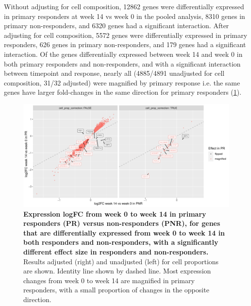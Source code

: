 Without adjusting for cell composition,
12862 genes were differentially expressed in primary responders at week 14 vs week 0 in the pooled analysis,
8310 genes in primary non-responders,
and 6320 genes had a significant interaction.
After adjusting for cell composition, 
5572 genes were differentially expressed in primary responders,
626 genes in primary non-responders,
and 179 genes had a significant interaction.
Of the genes differentially expressed between week 14 and week 0 in both primary responders and non-responders,
and with a significant interaction between timepoint and response, 
nearly all (4885/4891 unadjusted for cell composition, 31/32 adjusted) were magnified by primary response i.e.
the same genes have larger fold-changes in the same direction for primary responders (\cref{fig:multipants_dge_logFC_C_3R_1R_vs_logFC_C_3N_1N}).

\begin{figure}
    \centering
    \includegraphics[width=1.0\textwidth,page=1]{mainmatter/figures/chapter_04/plot_gene_set_enrichment.logFC_C_3R_1R_vs_logFC_C_3N_1N.pdf}
    \caption{
        \textbf{Expression logFC from week 0 to week 14 in primary responders (PR) versus non-responders (PNR),
        for genes that are differentially expressed from week 0 to week 14 in both responders and non-responders, with a significantly different effect size in responders and non-responders.
        }
        Results adjusted (right) and unadjusted (left) for cell proportions are shown.
        Identity line shown by dashed line.
        Most expression changes from week 0 to week 14 are magnified in primary responders, with a small proportion of changes in the opposite direction.
    }
    \label{fig:multipants_dge_logFC_C_3R_1R_vs_logFC_C_3N_1N}
\end{figure}

